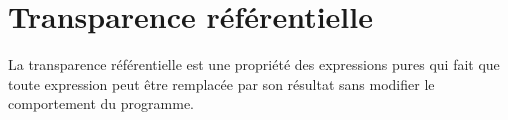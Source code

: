 \section{Transparence référentielle}
\label{sec:referential-transparency}

La transparence référentielle est une propriété des expressions pures qui fait que toute expression peut être remplacée par son résultat sans modifier le comportement du programme.
